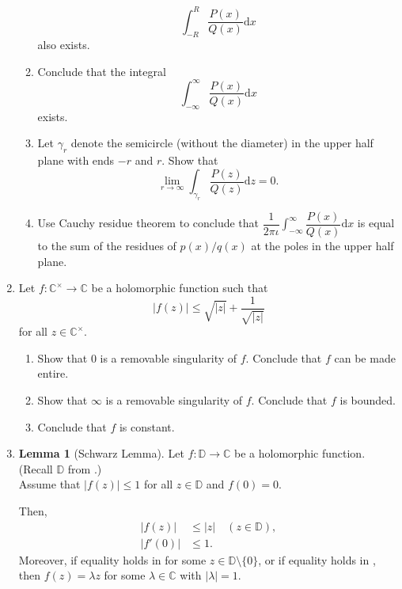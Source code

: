 \documentclass[12pt]{article}
\theoremstyle{definition}
\numberwithin{thm}{section}
\newtheorem{lem}[thm]{Lemma}
\newcommand{\md}[1]{{\left\lvert #1 \right\lvert}}
\begin{document}
\begin{enumerate}
\begin{enumerate}
\begin{equation*}
			\int_{-R}^{R} \dfrac{P(x)}{Q(x)} {\mathrm{d}}x
		\end{equation*}
		also exists.
		\item Conclude that the integral
		\begin{equation*} 
			\int_{-\infty}^{\infty} \dfrac{P(x)}{Q(x)} {\mathrm{d}}x
		\end{equation*}
		exists.
		\item Let $\gamma_r$ denote the semicircle (without the diameter) in the upper half plane with ends $-r$ and $r.$ Show that 
		\begin{equation*} 
			\lim_{r\to \infty}\int_{\gamma_r}^{} \dfrac{P(z)}{Q(z)} {\mathrm{d}}z = 0.
		\end{equation*}
		\item Use Cauchy residue theorem to conclude that $\displaystyle\dfrac{1}{2\pi\iota}\int_{-\infty}^{\infty} \dfrac{P(x)}{Q(x)} {\mathrm{d}}x$ is equal to the sum of the residues of $p(x)/q(x)$ at the poles in the upper half plane.
	\end{enumerate}
	\item Let $f:\mathbb{C}^\times\to\mathbb{C}$ be a holomorphic function such that 
	\begin{equation*} 
		|f(z)| \le \sqrt{|z|} + \dfrac{1}{\sqrt{|z|}}
	\end{equation*}
	for all $z \in \mathbb{C}^\times.$ 
	\begin{enumerate}
		\item Show that $0$ is a removable singularity of $f.$ Conclude that $f$ can be made entire.
		\item Show that $\infty$ is a removable singularity of $f.$ Conclude that $f$ is bounded.
		\item Conclude that $f$ is constant.
	\end{enumerate}
	\item \begin{lem}[Schwarz Lemma]
	Let $f : \mathbb{D} \to \mathbb{C}$ be a holomorphic function. (Recall $\mathbb{D}$ from .) \\
	Assume that $\md{f(z)} \le 1$ for all $z \in \mathbb{D}$ and $f(0) = 0$. 

	Then,
	\begin{align} 
		\md{f(z)} &\le \md{z} \quad (z \in \mathbb{D}), \label{eq:01}\\
		\md{f'(0)} &\le 1. \label{eq:02}
	\end{align}
	Moreover, if equality holds in  for some $z \in \mathbb{D} \setminus \{0\}$, or if equality holds in , then $f(z) = \lambda z$ for some $\lambda \in \mathbb{C}$ with $\md{\lambda} = 1$.
	\end{lem}


\end{enumerate}
\end{document}
